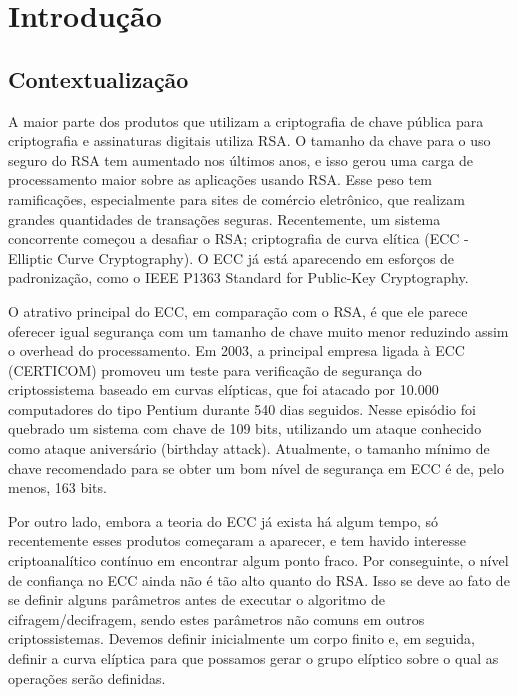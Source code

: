 \chapter*[Introdução]{Introdução}

\section*{Contextualização}
A maior parte dos produtos que utilizam a criptografia de chave pública para criptografia e assinaturas digitais utiliza RSA. O tamanho da chave para o uso seguro do RSA tem aumentado nos últimos anos, e isso gerou uma carga de processamento maior sobre as aplicações usando RSA. Esse peso tem ramificações, especialmente para sites de comércio eletrônico, que realizam grandes quantidades de transações seguras. Recentemente, um sistema concorrente começou a desafiar o RSA; criptografia de curva elítica (ECC - Elliptic Curve Cryptography). O ECC já está aparecendo em esforços de padronização, como o IEEE P1363 Standard for Public-Key Cryptography. \cite{Lee:2011}

O atrativo principal do ECC, em comparação com o RSA, é que ele parece oferecer igual segurança com um tamanho de chave muito menor reduzindo assim o overhead do processamento. \cite{Stallings:2011} Em 2003, a principal empresa ligada à ECC (CERTICOM) promoveu um teste para verificação de segurança do criptossistema baseado em curvas elípticas, que foi atacado por 10.000 computadores do tipo Pentium durante 540 dias seguidos. Nesse episódio foi quebrado um sistema com chave de 109 bits, utilizando um ataque conhecido como ataque aniversário (birthday attack). Atualmente, o tamanho mínimo de chave recomendado para se obter um bom nível de segurança em ECC é de, pelo menos, 163 bits. \cite{Sangalli}

Por outro lado, embora a teoria do ECC já exista há algum tempo, só recentemente esses produtos começaram a aparecer, e tem havido interesse criptoanalítico contínuo em encontrar algum ponto fraco. Por conseguinte, o nível de confiança no ECC ainda não é tão alto quanto do RSA. \cite{Stallings:2011} Isso se deve ao fato de se definir alguns parâmetros antes de executar o algoritmo de cifragem/decifragem, sendo estes parâmetros não comuns em outros criptossistemas. Devemos definir inicialmente um corpo finito e, em seguida, definir a curva elíptica para que possamos gerar o grupo elíptico sobre o qual as operações serão definidas. \cite{Sangalli}

